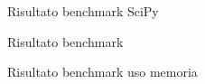 \documentclass[10pt]{article}
\begin{document}
\begin{figure}
	\centering
	\caption{Risultato benchmark SciPy}
	\label{fig:benchmark0}
\end{figure}

\begin{figure}
	\centering
	\caption{Risultato benchmark}
	\label{fig:benchmark1}
\end{figure}

\begin{figure}
\centering
{}
\caption{Risultato benchmark uso memoria}
\label{fig:benchmark2}
\end{figure}
\end{document}
